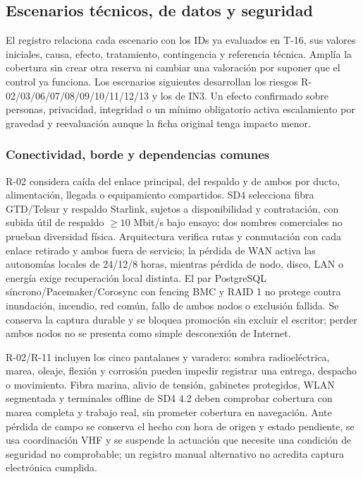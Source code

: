 \subsection{Escenarios técnicos, de datos y seguridad}\label{sec:sd8-tecnicos}
El registro  relaciona cada escenario con los IDs ya evaluados en T-16, sus valores iniciales, causa, efecto, tratamiento, contingencia y referencia técnica. Amplía la cobertura sin crear otra reserva ni cambiar una valoración por suponer que el control ya funciona. Los escenarios siguientes desarrollan los riesgos R-02/03/06/07/08/09/10/11/12/13 y los de IN3. Un efecto confirmado sobre personas, privacidad, integridad o un mínimo obligatorio activa escalamiento por gravedad y reevaluación aunque la ficha original tenga impacto menor.

\subsubsection{Conectividad, borde y dependencias comunes}
R-02 considera caída del enlace principal, del respaldo y de ambos por ducto, alimentación, llegada o equipamiento compartidos. SD4 selecciona fibra GTD/Telsur y respaldo Starlink, sujetos a disponibilidad y contratación, con subida útil de respaldo $\ge10$ Mbit/s bajo ensayo; dos nombres comerciales no prueban diversidad física. Arquitectura verifica rutas y conmutación con cada enlace retirado y ambos fuera de servicio; la pérdida de WAN activa las autonomías locales de 24/12/8 horas, mientras pérdida de nodo, disco, LAN o energía exige recuperación local distinta. El par PostgreSQL síncrono/Pacemaker/Corosync con fencing BMC y RAID 1 no protege contra inundación, incendio, red común, fallo de ambos nodos o exclusión fallida. Se conserva la captura durable y se bloquea promoción sin excluir el escritor; perder ambos nodos no se presenta como simple desconexión de Internet. \parencites[art.~16.4; p.~12]{sd8-ba}[RT-02.11; RT-03.10--17; pp.~7, 9]{sd8-bt}

R-02/R-11 incluyen los cinco pantalanes y varadero: sombra radioeléctrica, marea, oleaje, flexión y corrosión pueden impedir registrar una entrega, despacho o movimiento. Fibra marina, alivio de tensión, gabinetes protegidos, WLAN segmentada y terminales offline de SD4 4.2 deben comprobar cobertura con marea completa y trabajo real, sin prometer cobertura en navegación. Ante pérdida de campo se conserva el hecho con hora de origen y estado pendiente, se usa coordinación VHF y se suspende la actuación que necesite una condición de seguridad no comprobable; un registro manual alternativo no acredita captura electrónica cumplida.

